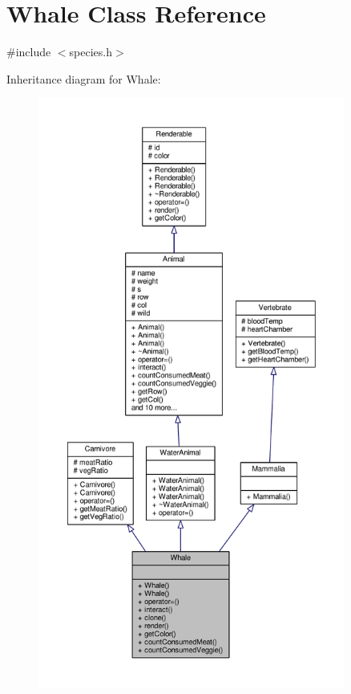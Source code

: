 \hypertarget{classWhale}{}\section{Whale Class Reference}
\label{classWhale}


{\ttfamily \#include $<$species.\+h$>$}



Inheritance diagram for Whale\+:
\nopagebreak
\begin{figure}[H]
\begin{center}
\leavevmode
\includegraphics[height=550pt]{classWhale__inherit__graph}
\end{center}
\end{figure}


